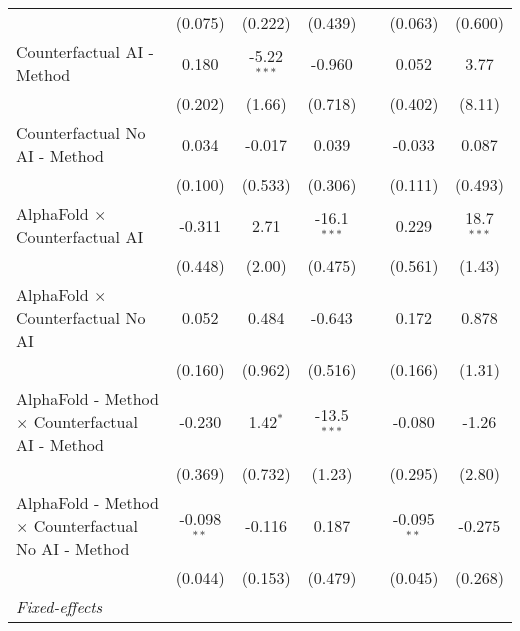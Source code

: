 \begin{tabular}{lcccccc}
                                                              & (0.075)       & (0.222)       & (0.439)       &               & (0.063)       & (0.600)\\   
   Counterfactual AI - Method                                 & 0.180         & -5.22$^{***}$ & -0.960        &               & 0.052         & 3.77\\   
                                                              & (0.202)       & (1.66)        & (0.718)       &               & (0.402)       & (8.11)\\   
   Counterfactual No AI - Method                              & 0.034         & -0.017        & 0.039         &               & -0.033        & 0.087\\   
                                                              & (0.100)       & (0.533)       & (0.306)       &               & (0.111)       & (0.493)\\   
   AlphaFold $\times$ Counterfactual AI                       & -0.311        & 2.71          & -16.1$^{***}$ &               & 0.229         & 18.7$^{***}$\\   
                                                              & (0.448)       & (2.00)        & (0.475)       &               & (0.561)       & (1.43)\\   
   AlphaFold $\times$ Counterfactual No AI                    & 0.052         & 0.484         & -0.643        &               & 0.172         & 0.878\\   
                                                              & (0.160)       & (0.962)       & (0.516)       &               & (0.166)       & (1.31)\\   
   AlphaFold - Method $\times$ Counterfactual AI - Method     & -0.230        & 1.42$^{*}$    & -13.5$^{***}$ &               & -0.080        & -1.26\\   
                                                              & (0.369)       & (0.732)       & (1.23)        &               & (0.295)       & (2.80)\\   
   AlphaFold - Method $\times$ Counterfactual No AI - Method  & -0.098$^{**}$ & -0.116        & 0.187         &               & -0.095$^{**}$ & -0.275\\   
                                                              & (0.044)       & (0.153)       & (0.479)       &               & (0.045)       & (0.268)\\   
   \midrule
   \emph{Fixed-effects}\\

\end{tabular}
